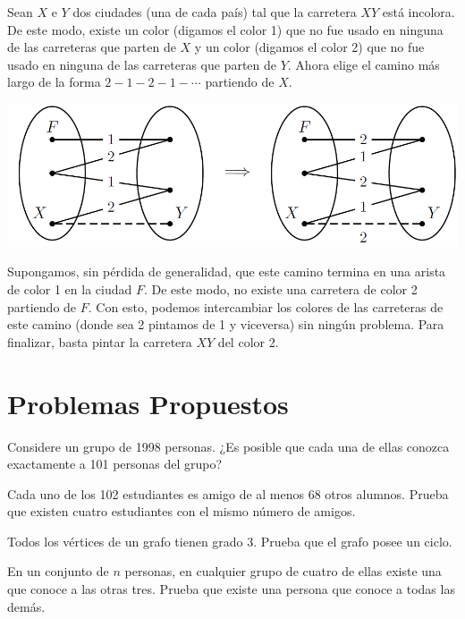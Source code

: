 \documentclass[11pt]{scrartcl}
\begin{document}
Sean $X$ e $Y$ dos ciudades (una de cada país) tal que la carretera $XY$ está incolora. De este modo, existe un color (digamos el color 1) que no fue usado en ninguna de las carreteras que parten de $X$ y un color (digamos el color 2) que no fue usado en ninguna de las carreteras que parten de $Y$. Ahora elige el camino más largo de la forma $2-1-2-1-\cdots$ partiendo de $X$.
\begin{center}
    \includegraphics[scale=0.75]{images/clase_10_grafo_5.png}
\end{center}
Supongamos, sin pérdida de generalidad, que este camino termina en una arista de color 1 en la ciudad $F$. De este modo, no existe una carretera de color 2 partiendo de $F$. Con esto, podemos intercambiar los colores de las carreteras de este camino (donde sea 2 pintamos de 1 y viceversa) sin ningún problema. Para finalizar, basta pintar la carretera $XY$ del color 2.

\section{Problemas Propuestos}

\begin{problem}
Considere un grupo de 1998 personas. ¿Es posible que cada una de ellas conozca exactamente a 101 personas del grupo?
\end{problem}

\begin{problem}
Cada uno de los 102 estudiantes es amigo de al menos 68 otros alumnos. Prueba que existen cuatro estudiantes con el mismo número de amigos.
\end{problem}

\begin{problem}
Todos los vértices de un grafo tienen grado 3. Prueba que el grafo posee un ciclo.
\end{problem}

\begin{problem}
En un conjunto de \( n \) personas, en cualquier grupo de cuatro de ellas existe una que conoce a las otras tres. Prueba que existe una persona que conoce a todas las demás.
\end{problem}
\end{document}
